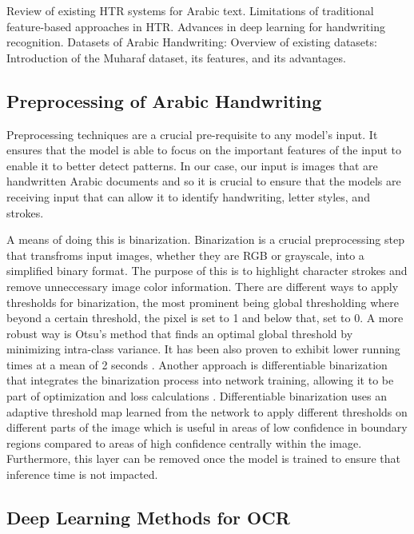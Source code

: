 \documentclass[conference]{IEEEtran}
\begin{document}
Review of existing HTR systems for Arabic text.
Limitations of traditional feature-based approaches in HTR.
Advances in deep learning for handwriting recognition.
Datasets of Arabic Handwriting:
Overview of existing datasets: 
Introduction of the Muharaf dataset, its features, and its advantages.


\subsection{Preprocessing of Arabic Handwriting}

Preprocessing techniques are a crucial pre-requisite to any model's input. It ensures that the model is able to focus on the important features of the input to enable it to better detect patterns. In our case, our input is images that are handwritten Arabic documents and so it is crucial to ensure that the models are receiving input that can allow it to identify handwriting, letter styles, and strokes. 

A means of doing this is binarization. Binarization is a crucial preprocessing step that transfroms input images, whether they are RGB or grayscale, into a simplified binary format. The purpose of this is to highlight character strokes and remove unneccessary image color information. There are different ways to apply thresholds for binarization, the most prominent being global thresholding where beyond a certain threshold, the pixel is set to 1 and below that, set to 0. A more robust way is Otsu's method \cite{otsu1979aa} that finds an optimal global threshold by minimizing intra-class variance. It has been also proven to exhibit lower running times at a mean of 2 seconds \cite{sahlol2014proposed}. Another approach is differentiable binarization that integrates the binarization process into network training, allowing it to be part of optimization and loss calculations \cite{liao2022real}. Differentiable binarization uses an adaptive threshold map learned from the network to apply different thresholds on different parts of the image which is useful in areas of low confidence in boundary regions compared to areas of high confidence centrally within the image. Furthermore, this layer can be removed once the model is trained to ensure that inference time is not impacted.  


\subsection{Deep Learning Methods for OCR}
\end{document}
